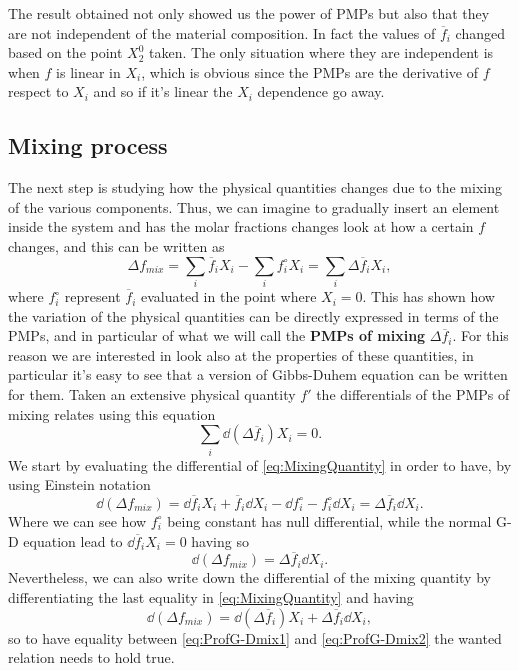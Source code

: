 \nt
{
    The result obtained not only showed us the power of PMPs but also that they are not independent of the material composition. In fact the values of $\overline{f}_i$ changed based on the point $X_2^0$ taken. The only situation where they are independent is when $f$ is linear in $X_i$, which is obvious since the PMPs are the derivative of $f$ respect to $X_i$ and so if it's linear the $X_i$ dependence go away.
}

\subsection{Mixing process}

The next step is studying how the physical quantities changes due to the mixing of the various components. Thus, we can imagine to gradually insert an element inside the system and has the molar fractions changes look at how a certain $f$ changes, and this can be written as
\begin{equation}
    \label{eq:MixingQuantity}
    \Delta f_{mix} = \sum_i \overline{f}_i X_i - \sum_i f_i^\circ  X_i = \sum_i \Delta \overline{f}_i X_i,
\end{equation}
where $f_i^\circ$ represent $\overline{f}_i$ evaluated in the point where $X_i = 0$. This has shown how the variation of the physical quantities can be directly expressed in terms of the PMPs, and in particular of what we will call the \textbf{PMPs of mixing} $\Delta \overline{f}_i$. For this reason we are interested in look also at the properties of these quantities, in particular it's easy to see that a version of Gibbs-Duhem equation can be written for them.
{
    Taken an extensive physical quantity $f'$ the differentials of the PMPs of mixing relates using this equation
    \begin{equation}
        \label{eq:GDmixing}
        \sum_i\dd (\Delta \overline{f}_i) X_i = 0.
    \end{equation}
}
{
    We start by evaluating the differential of \eqref{eq:MixingQuantity} in order to have, by using Einstein notation
    \begin{equation}
        \dd (\Delta f_{mix}) = \dd \overline{f}_i X_i + \overline{f}_i\dd X_i - \dd f_i^\circ - f_i^\circ \dd X_i = \Delta \overline{f}_i \dd X_i.
    \end{equation}
    Where we can see how $f_i^\circ$ being constant has null differential, while the normal G-D equation lead to $\dd \overline{f}_i X_i = 0$ having so
    \begin{equation}
        \label{eq:ProfG-Dmix1}
        \dd (\Delta f_{mix}) = \Delta \overline{f}_i \dd X_i.
    \end{equation}
    Nevertheless, we can also write down the differential of the mixing quantity by differentiating the last equality in \eqref{eq:MixingQuantity} and having
    \begin{equation}
        \label{eq:ProfG-Dmix2}
        \dd (\Delta f_{mix}) = \dd (\Delta \overline{f}_i) X_i + \Delta \overline{f}_i \dd X_i,
    \end{equation}
    so to have equality between \eqref{eq:ProfG-Dmix1} and \eqref{eq:ProfG-Dmix2} the wanted relation needs to hold true.
}

